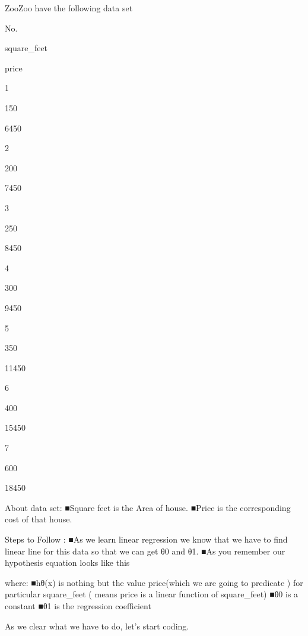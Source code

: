 
ZooZoo have the following data set

 


No.    
 
        square_feet       
 
         price     
 


1
 
150
 
6450
 


2
 
200
 
7450
 


3
 
250
 
8450
 


4
 
300
 
9450
 


5
 
350
 
11450
 


6
 
400
 
15450
 


7
 
600
 
18450
 

 
 
 
 
 
 
About data set:
 ■Square feet is the  Area of house.
 ■Price is the corresponding cost of  that house.
 
Steps to Follow :
 ■As we learn linear regression we know that we have to find linear line for this data so that we can get  θ0 and θ1.
 ■As you remember our hypothesis equation looks like this
 


where:
 ■hθ(x) is nothing but the value price(which we are going to predicate ) for particular square_feet  ( means price is a linear function of square_feet)
 ■θ0 is a constant
 ■θ1 is the regression coefficient
 
As we clear what we have to do, let’s start coding.
 

